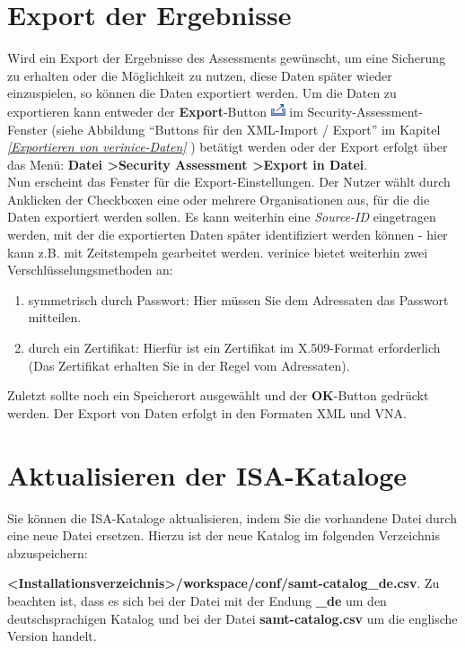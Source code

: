 \documentclass[a4paper,10pt]{book}
\begin{document}
\section {Export der Ergebnisse}
Wird ein Export der Ergebnisse des Assessments gewünscht, um eine Sicherung zu erhalten oder die Möglichkeit zu nutzen,
diese Daten später wieder einzuspielen, so können die Daten exportiert werden. Um die Daten zu exportieren kann
entweder der \textbf{Export}-Button \includegraphics[height=2ex]{Icon/Export.png} im Security-Assessment-Fenster
(siehe Abbildung ``Buttons für den XML-Import / Export'' im Kapitel {\em \ref{Exportieren von verinice-Daten} }) betätigt
werden oder der Export erfolgt über das Menü: \textbf{Datei \textgreater Security Assessment \textgreater Export in Datei}.
\newline\\
Nun erscheint das Fenster für die Export-Einstellungen. Der Nutzer wählt durch Anklicken der Checkboxen eine oder mehrere Organisationen aus,
für die die Daten exportiert werden sollen. Es kann weiterhin eine \textit{Source-ID} eingetragen werden, mit der die exportierten Daten später
identifiziert werden können - hier kann z.B. mit Zeitstempeln gearbeitet werden. verinice bietet weiterhin zwei Verschlüsselungsmethoden an:
\begin{enumerate}
\item symmetrisch durch Passwort: Hier müssen Sie dem Adressaten das Passwort
mitteilen.
\item durch ein Zertifikat: Hierfür ist ein Zertifikat im X.509-Format
erforderlich (Das Zertifikat erhalten Sie in der Regel vom Adressaten).
\end{enumerate}
Zuletzt sollte noch ein Speicherort ausgewählt und der \textbf{OK}-Button
gedrückt werden. Der Export von Daten erfolgt in den Formaten XML und VNA.

\section{Aktualisieren der ISA-Kataloge}
Sie können die ISA-Kataloge aktualisieren, indem Sie die vorhandene Datei durch eine neue Datei ersetzen.
Hierzu ist der neue Katalog im folgenden Verzeichnis abzuspeichern:

\textbf{\textless Installationsverzeichnis\textgreater/workspace/conf/samt-catalog\_de.csv}.
Zu beachten ist, dass es sich bei der Datei mit der Endung \textbf{\_de} um den deutschsprachigen Katalog und bei der Datei \textbf{samt-catalog.csv}
um die englische Version handelt.
\end{document}
